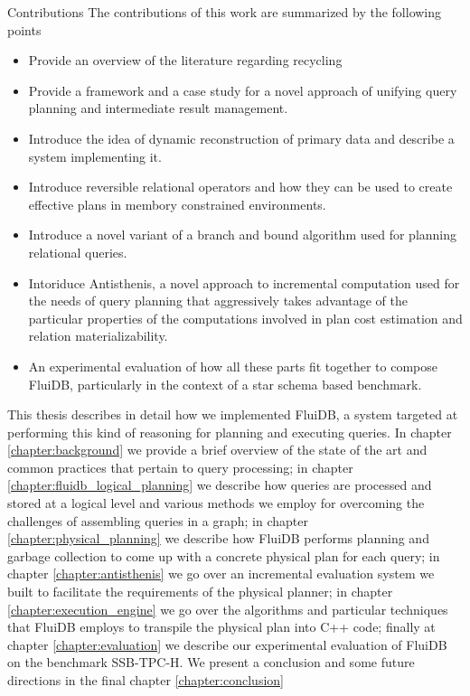 \begin{correction}{Contributions}
The contributions of this work are summarized by the following points

\begin{itemize}
\item Provide an overview of the literature regarding recycling
\item Provide a framework and a case study for a novel approach of
  unifying query planning and intermediate result management.
\item Introduce the idea of dynamic reconstruction of primary data and
  describe a system implementing it.
\item Introduce reversible relational operators and how they can be
  used to create effective plans in membory constrained environments.
\item Introduce a novel variant of a branch and bound algorithm used
  for planning relational queries.
\item Intoriduce Antisthenis, a novel approach to incremental
  computation used for the needs of query planning that aggressively
  takes advantage of the particular properties of the computations
  involved in plan cost estimation and relation materializability.
\item An experimental evaluation of how all these parts fit together
  to compose FluiDB, particularly in the context of a star schema
  based  benchmark.
\end{itemize}

\end{correction}

This thesis describes in detail how we implemented FluiDB, a system
targeted at performing this kind of reasoning for planning and
executing queries. In chapter \ref{chapter:background} we provide a
brief overview of the state of the art and common practices that
pertain to query processing; in chapter
\ref{chapter:fluidb_logical_planning} we describe how queries are
processed and stored at a logical level and various methods we employ for
overcoming the challenges of assembling queries in a graph; in chapter
\ref{chapter:physical_planning} we describe how FluiDB performs
planning and garbage collection to come up with a concrete physical
plan for each query; in chapter \ref{chapter:antisthenis} we go over
an incremental evaluation system we built to facilitate the
requirements of the physical planner; in chapter
\ref{chapter:execution_engine} we go over the algorithms and
particular techniques that FluiDB employs to transpile the physical
plan into C++ code; finally at chapter \ref{chapter:evaluation} we
describe our experimental evaluation of FluiDB on the benchmark
SSB-TPC-H. We present a conclusion and some future directions in the
final chapter \ref{chapter:conclusion}
